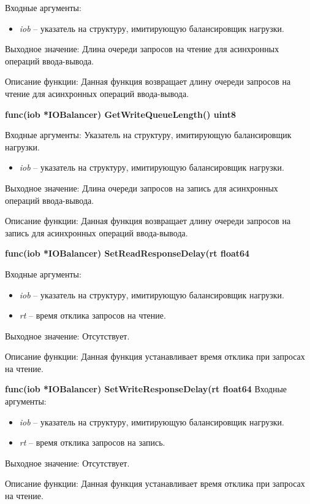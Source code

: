 Входные аргументы: 
\begin{itemize}
	\item \textit{iob} -- указатель на структуру, имитирующую балансировщик нагрузки. 
\end{itemize}

Выходное значение: Длина очереди запросов на чтение для асинхронных операций ввода-вывода.

Описание функции: Данная функция возвращает длину очереди запросов на чтение для асинхронных операций ввода-вывода.

\textbf{func(iob *IOBalancer) GetWriteQueueLength() uint8}

Входные аргументы: Указатель на структуру, имитирующую балансировщик нагрузки.
\begin{itemize}
	\item \textit{iob} -- указатель на структуру, имитирующую балансировщик нагрузки. 
\end{itemize}

Выходное значение: Длина очереди запросов на запись для асинхронных операций ввода-вывода. 

Описание функции: Данная функция возвращает длину очереди запросов на запись для асинхронных операций ввода-вывода.

\textbf{func(iob *IOBalancer) SetReadResponseDelay(rt float64}

Входные аргументы:
\begin{itemize}
	\item \textit{iob} -- указатель на структуру, имитирующую балансировщик нагрузки. 
	\item \textit{rt} -- время отклика запросов на чтение. 
\end{itemize}

Выходное значение: Отсутствует. 

Описание функции: Данная функция устанавливает время отклика при запросах на чтение.

\textbf{func(iob *IOBalancer) SetWriteResponseDelay(rt float64}
Входные аргументы: 
\begin{itemize}
	\item \textit{iob} -- указатель на структуру, имитирующую балансировщик нагрузки. 
	\item \textit{rt} -- время отклика запросов на запись.
\end{itemize}

Выходное значение: Отсутствует.

Описание функции: Данная функция устанавливает время отклика при запросах на чтение.

